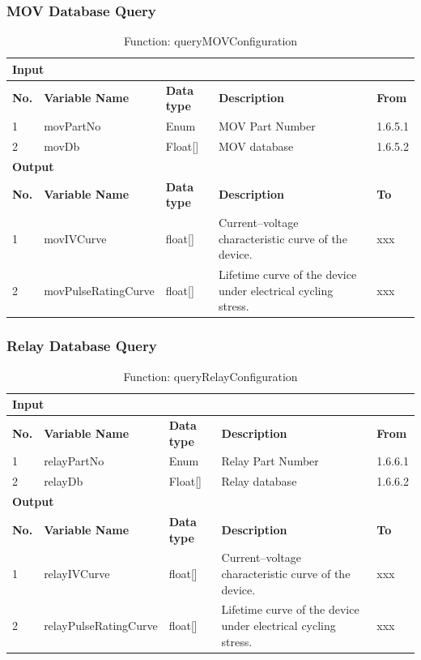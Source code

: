 \documentclass{article}
\begin{document}
\subsubsection{MOV Database Query}
\begin{table}[h]
\centering
\caption{Function: queryMOVConfiguration}
\begin{tabular}{|l|l|l|l|l|}
\hline
\multicolumn{5}{|l|}{\textbf{Input}} \\ \hline
\textbf{No.} & \textbf{Variable Name} & \textbf{Data type} & \textbf{Description} & \textbf{From} \\ \hline
1 & movPartNo & Enum & MOV Part Number & 1.6.5.1 \\ \hline
2 & movDb & Float[] & MOV database & 1.6.5.2 \\ \hline
\multicolumn{5}{|l|}{\textbf{Output}} \\ \hline
\textbf{No.} & \textbf{Variable Name} & \textbf{Data type} & \textbf{Description} & \textbf{To} \\ \hline
1 & movIVCurve & float[] & Current–voltage characteristic curve of the device. & xxx \\ \hline
2 & movPulseRatingCurve & float[] & Lifetime curve of the device under electrical cycling stress. & xxx \\ \hline
\end{tabular}
\end{table}

\subsubsection{Relay Database Query}
\begin{table}[h]
\centering
\caption{Function: queryRelayConfiguration}
\begin{tabular}{|l|l|l|l|l|}
\hline
\multicolumn{5}{|l|}{\textbf{Input}} \\ \hline
\textbf{No.} & \textbf{Variable Name} & \textbf{Data type} & \textbf{Description} & \textbf{From} \\ \hline
1 & relayPartNo & Enum & Relay Part Number & 1.6.6.1 \\ \hline
2 & relayDb & Float[] & Relay database & 1.6.6.2 \\ \hline
\multicolumn{5}{|l|}{\textbf{Output}} \\ \hline
\textbf{No.} & \textbf{Variable Name} & \textbf{Data type} & \textbf{Description} & \textbf{To} \\ \hline
1 & relayIVCurve & float[] & Current–voltage characteristic curve of the device. & xxx \\ \hline
2 & relayPulseRatingCurve & float[] & Lifetime curve of the device under electrical cycling stress. & xxx \\ \hline
\end{tabular}
\end{table}
\end{document}
